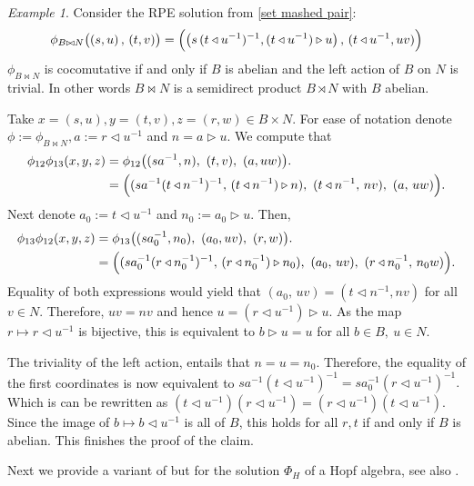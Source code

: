 \documentclass[a4paper,10pt]{amsart}
\theoremstyle{definition}
\theoremstyle{remark}
\newtheorem{example}[lemma]{Example}
\newcommand\triangler{\triangleright}
\newcommand\trianglel{\triangleleft}
\begin{document}
\begin{example} \label{matched pair cocomm example}
Consider the RPE solution from \eqref{set mashed pair}:
$$
\phi_{B\bowtie N}\bigl((s,u)\, ,\, (t,v)\bigr)
=
\Bigl( \bigl(s\,(t\triangleleft u^{-1})^{-1}, (t\triangleleft u^{-1})\triangleright u\bigr) \, , \,
(t\triangleleft u^{-1},  uv ) \Bigr)
$$
 $\phi_{B\bowtie N}$ is cocomutative if and only if $B$ is abelian and the left action of $B$ on $N$ is trivial. In other words $B \bowtie N$ is a semidirect product $B \rtimes N$ with $B$ abelian. \medskip

 Take $x=(s,u), y=(t,v), z=(r,w)\in B \times N$. For ease of notation denote $\phi := \phi_{B\bowtie N}, a := r\trianglel u^{-1}$ and $n = a \triangler u$. We compute that
 \begin{align*}
 \phi_{12}\phi_{13}(x,y,z) & = \phi_{12}\bigl(
(s a^{-1}, n),\ (t,v),\ (a,uw)
\bigr).\\ 
& = \Bigl(
(s a^{-1}( t\trianglel n^{-1})^{-1},\, (t\trianglel n^{-1})\triangler n),\ 
( t\trianglel n^{-1},\, n v),\ 
(a,\, uw)
\Bigr). 
 \end{align*}
Next denote $a_0 := t\trianglel u^{-1}$ and $n_0 := a_0\triangler u.$ Then,
\begin{align*}
 \phi_{13}\phi_{12}(x,y,z) & = \phi_{13} \bigl(
(s a_0^{-1}, n_0),\ (a_0,uv),\ (r,w)
\bigr). \\
& = \Bigl(
(s a_0^{-1}(r\triangleleft n_0^{-1})^{-1},\, (r\triangleleft n_0^{-1})\triangleright n_0),\ 
(a_0,\, uv),\ 
(r\triangleleft n_0^{-1},\, n_0 w)
\Bigr). 
\end{align*}
Equality of both expressions would yield that $(a_0,\, uv) = (t\trianglel n^{-1}, nv)$ for all $v \in N$. Therefore, $uv = nv$ and hence $u = (r\trianglel u^{-1}) \triangler u$. As the map $r\mapsto r\triangleleft u^{-1}$ is bijective, this is equivalent to $ b\triangleright u = u$ for all $b\in B,\ u\in N$.

The triviality of the left action, entails that $n = u = n_0$. Therefore, the equality of the first coordinates is now equivalent to $sa^{-1}(t \trianglel u^{-1})^{-1} = sa_0^{-1}(r\trianglel u^{-1})^{-1}.$ Which is can be rewritten as $(t \trianglel u^{-1}) (r \trianglel u^{-1}) = (r\trianglel u^{-1}) (t \trianglel u^{-1})$. Since the image of $b\mapsto b\triangleleft u^{-1}$ is all of $B$, this holds for all $r,t$ if and only if $B$ is abelian. This finishes the proof of the claim.
\end{example}

Next we provide a variant of  but for the solution $\Phi_H$ of a Hopf algebra, see also \cite[Proposition 2.7]{Mi98}.
\end{document}
